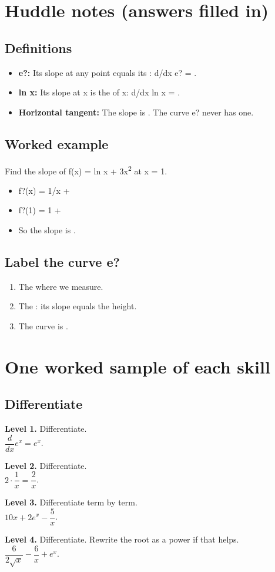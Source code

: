 \documentclass[11pt]{article}
\begin{document}
\section*{Huddle notes (answers filled in)}
\subsection*{Definitions}\begin{itemize}
\item \textbf{e?:} Its slope at any point equals its : d/dx e? = .
\item \textbf{ln x:} Its slope at x is the  of x: d/dx ln x = .
\item \textbf{Horizontal tangent:} The slope is . The curve e? never has one.
\end{itemize}
\subsection*{Worked example}
Find the slope of f(x) = ln x + 3x\textsuperscript{2} at x = 1.\\
\begin{itemize}
\item f?(x) = 1/x + 
\item f?(1) = 1 + 
\item So the slope is .
\end{itemize}
\subsection*{Label the curve e?}
\begin{enumerate}
\item The  where we measure.
\item The : its slope equals the height.
\item The curve is .
\end{enumerate}
\section*{One worked sample of each skill}
\subsection*{Differentiate}
\noindent\textbf{Level 1.} Differentiate.\\  \quad $\dfrac{d}{dx}e^{x}=e^{x}$.\par\medskip
\noindent\textbf{Level 2.} Differentiate.\\  \quad $2\cdot\dfrac{1}{x}=\dfrac{2}{x}$.\par\medskip
\noindent\textbf{Level 3.} Differentiate term by term.\\  \quad $10x+2e^{x}-\dfrac{5}{x}$.\par\medskip
\noindent\textbf{Level 4.} Differentiate. Rewrite the root as a power if that helps.\\  \quad $\dfrac{6}{2\sqrt{x}}-\dfrac{6}{x}+e^{x}$.\par\medskip
\end{document}
